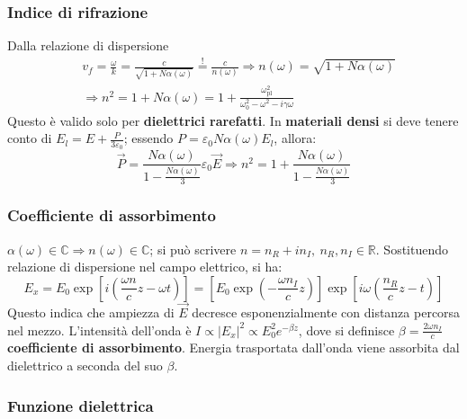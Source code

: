 \documentclass[a4paper]{scrartcl}
\numberwithin{equation}{subsection}
\theoremstyle{style1}
\begin{document}
\subsubsection{Indice di rifrazione}
Dalla relazione di dispersione
\begin{equation}
	\begin{split}
		&v_f = \frac{\omega}{k} = \frac{c}{\sqrt{1+N\alpha (\omega)} } \stackrel{!}{=} \frac{c}{n(\omega)}\Rightarrow n(\omega) = \sqrt{1+ N\alpha (\omega)} \\
		&\Rightarrow n^2 = 1+N\alpha (\omega) = 1 + \frac{\omega_\text{pl}^2}{\omega_0^2 - \omega^2 - i\gamma\omega}
	\end{split}
\end{equation}
Questo \`e valido solo per \textbf{dielettrici rarefatti}. In \textbf{materiali densi} si deve tenere conto di $E_l = E + \frac{P}{3\varepsilon _0}$; essendo $ P = \varepsilon _0 N \alpha (\omega) E_l$, allora:
\begin{equation}
	\vec{P}=\frac{N\alpha (\omega)}{1- \frac{N\alpha (\omega)}{3}}\varepsilon _0 \vec{E}\Rightarrow n^2 = 1+ \frac{N\alpha (\omega)}{1-\frac{N\alpha (\omega)}{3}}
\end{equation}
\subsubsection{Coefficiente di assorbimento}
$\alpha (\omega) \in \mathbb{C}\Rightarrow n(\omega)\in \mathbb{C}$; si pu\`o scrivere $n = n_R + i n_I , \ n_R, n_I \in \mathbb{R}$. Sostituendo relazione di dispersione nel campo elettrico, si ha:
\begin{equation}
	E_x = E_0 \exp \left[ i\left(\frac{\omega n}{c}z - \omega t\right)  \right]  = \left[ E_0 \exp \left(- \frac{\omega n_I}{c}z\right)   \right] \exp\left[ i\omega \left(\frac{n_R}{c}z - t\right)  \right]  
\end{equation}
Questo indica che ampiezza di $\vec{E}$ decresce esponenzialmente con distanza percorsa nel mezzo. L'intensit\`a dell'onda \`e $I \propto \left\lvert E_x \right\rvert ^2 \propto E_0^2 e^{- \beta z} $, dove si definisce $\beta  = \frac{2\omega n_I}{c}$ \textbf{coefficiente di assorbimento}. Energia trasportata dall'onda viene assorbita dal dielettrico a seconda del suo $\beta $.
\subsubsection{Funzione dielettrica}
\end{document}
